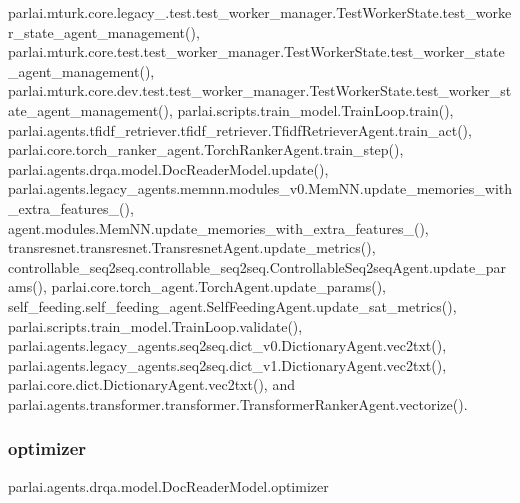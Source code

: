parlai.\+mturk.\+core.\+legacy\+\_.\+test.\+test\+\_\+worker\+\_\+manager.\+Test\+Worker\+State.\+test\+\_\+worker\+\_\+state\+\_\+agent\+\_\+management(), parlai.\+mturk.\+core.\+test.\+test\+\_\+worker\+\_\+manager.\+Test\+Worker\+State.\+test\+\_\+worker\+\_\+state\+\_\+agent\+\_\+management(), parlai.\+mturk.\+core.\+dev.\+test.\+test\+\_\+worker\+\_\+manager.\+Test\+Worker\+State.\+test\+\_\+worker\+\_\+state\+\_\+agent\+\_\+management(), parlai.\+scripts.\+train\+\_\+model.\+Train\+Loop.\+train(), parlai.\+agents.\+tfidf\+\_\+retriever.\+tfidf\+\_\+retriever.\+Tfidf\+Retriever\+Agent.\+train\+\_\+act(), parlai.\+core.\+torch\+\_\+ranker\+\_\+agent.\+Torch\+Ranker\+Agent.\+train\+\_\+step(), parlai.\+agents.\+drqa.\+model.\+Doc\+Reader\+Model.\+update(), parlai.\+agents.\+legacy\+\_\+agents.\+memnn.\+modules\+\_\+v0.\+Mem\+N\+N.\+update\+\_\+memories\+\_\+with\+\_\+extra\+\_\+features\+\_\+(), agent.\+modules.\+Mem\+N\+N.\+update\+\_\+memories\+\_\+with\+\_\+extra\+\_\+features\+\_\+(), transresnet.\+transresnet.\+Transresnet\+Agent.\+update\+\_\+metrics(), controllable\+\_\+seq2seq.\+controllable\+\_\+seq2seq.\+Controllable\+Seq2seq\+Agent.\+update\+\_\+params(), parlai.\+core.\+torch\+\_\+agent.\+Torch\+Agent.\+update\+\_\+params(), self\+\_\+feeding.\+self\+\_\+feeding\+\_\+agent.\+Self\+Feeding\+Agent.\+update\+\_\+sat\+\_\+metrics(), parlai.\+scripts.\+train\+\_\+model.\+Train\+Loop.\+validate(), parlai.\+agents.\+legacy\+\_\+agents.\+seq2seq.\+dict\+\_\+v0.\+Dictionary\+Agent.\+vec2txt(), parlai.\+agents.\+legacy\+\_\+agents.\+seq2seq.\+dict\+\_\+v1.\+Dictionary\+Agent.\+vec2txt(), parlai.\+core.\+dict.\+Dictionary\+Agent.\+vec2txt(), and parlai.\+agents.\+transformer.\+transformer.\+Transformer\+Ranker\+Agent.\+vectorize().

\mbox{\label{classparlai_1_1agents_1_1drqa_1_1model_1_1DocReaderModel_a97fe699cd31edef437716191498eedd9}} 
\subsubsection{\texorpdfstring{optimizer}{optimizer}}
{\footnotesize\ttfamily parlai.\+agents.\+drqa.\+model.\+Doc\+Reader\+Model.\+optimizer}



